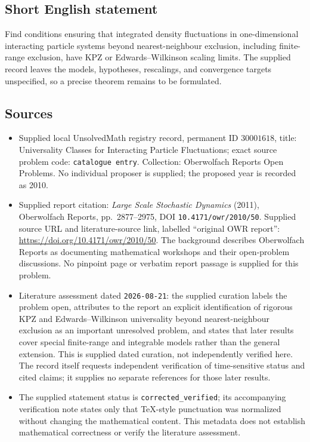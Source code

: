 \documentclass[11pt]{article}
\begin{document}
\subsection{Short English statement}
Find conditions ensuring that integrated density fluctuations in one-dimensional interacting particle systems beyond nearest-neighbour exclusion, including finite-range exclusion, have KPZ or Edwards--Wilkinson scaling limits. The supplied record leaves the models, hypotheses, rescalings, and convergence targets unspecified, so a precise theorem remains to be formulated.
\subsection{Sources}
\begin{itemize}
\item Supplied local UnsolvedMath registry record, permanent ID \(30001618\), title: Universality Classes for Interacting Particle Fluctuations; exact source problem code: \texttt{catalogue entry}. Collection: Oberwolfach Reports Open Problems. No individual proposer is supplied; the proposed year is recorded as 2010.
\item Supplied report citation: \emph{Large Scale Stochastic Dynamics} (2011), Oberwolfach Reports, pp.~2877--2975, DOI \texttt{10.4171/owr/2010/50}. Supplied source URL and literature-source link, labelled ``original OWR report'': \url{https://doi.org/10.4171/owr/2010/50}. The background describes Oberwolfach Reports as documenting mathematical workshops and their open-problem discussions. No pinpoint page or verbatim report passage is supplied for this problem.
\item Literature assessment dated \texttt{2026-08-21}: the supplied curation labels the problem open, attributes to the report an explicit identification of rigorous KPZ and Edwards--Wilkinson universality beyond nearest-neighbour exclusion as an important unresolved problem, and states that later results cover special finite-range and integrable models rather than the general extension. This is supplied dated curation, not independently verified here. The record itself requests independent verification of time-sensitive status and cited claims; it supplies no separate references for those later results.
\item The supplied statement status is \texttt{corrected\_verified}; its accompanying verification note states only that TeX-style punctuation was normalized without changing the mathematical content. This metadata does not establish mathematical correctness or verify the literature assessment.
\end{itemize}
\end{document}
